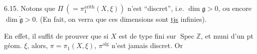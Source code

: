6.15. Notons que 
$\Pi\ (=\pi_1^{\mathrm{arith}}(X,\xi))$
n'est  ``discret'', i.e.
 $\dim\mathfrak{g}>0$,
 ou encore
$\dim\widetilde{\mathfrak{g}}>0$. (En fait, on verra que ces dimensions
sont \uline{tjs} infinies).

En effet, il suffit de prouver que si 
$X$ est de type fini sur $\operatorname{Spec}\mathbb{Z}$, et muni d'un
pt géom. $\xi$,  alors,
 
$\pi=\pi_1(X,\xi)$, $\pi^{\mathrm{alg}}$ n'est jamais discret. Or
